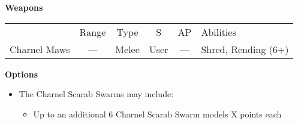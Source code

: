 \begin{minipage}[t]{0.72\textwidth}
	\vspace*{2em}
	\textbf{Weapons}
	
	\begin{tabular}{m{95 pt} *{4}{c} >{\raggedright\arraybackslash}p{130pt}}
		& Range & Type & S & AP & Abilities \\
		Charnel Maws & — & Melee & User & — & Shred, Rending (6+) \\
	\end{tabular}
		
	\vspace*{2em}
	\textbf{Options}
	\begin{itemize}
		\item The Charnel Scarab Swarms may include:
		\begin{itemize}
			\item Up to an additional 6 Charnel Scarab Swarm models \dotfill X points each
		\end{itemize}
	\end{itemize}
\end{minipage}


\newpage
\subsubsection[Triarch Praetorian Vanguard]{}

